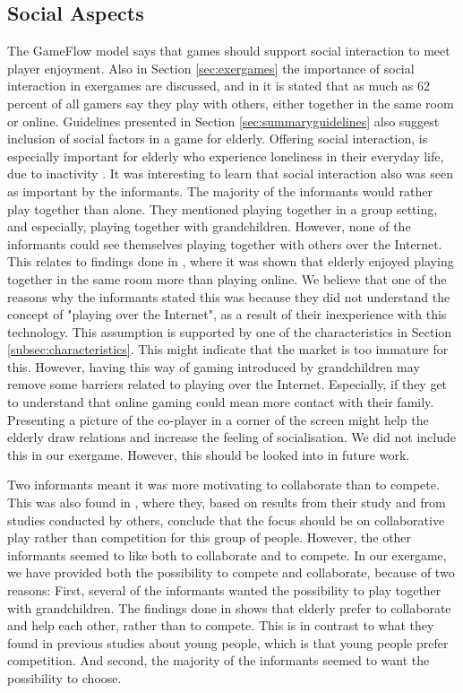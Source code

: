 \subsection{Social Aspects}
The GameFlow model says that games should support social interaction to meet player enjoyment. Also in Section \ref{sec:exergames} the importance of social interaction in exergames are discussed, and in \cite{statistics2012} it is stated that as much as 62 percent of all gamers say they play with others, either together in the same room or online. Guidelines presented in Section \ref{sec:summaryguidelines} also suggest inclusion of social factors in a game for elderly. Offering social interaction, is especially important for elderly who experience loneliness in their everyday life, due to inactivity \cite{exergamesforelderly}. It was interesting to learn that social interaction also was seen as important by the informants. The majority of the informants would rather play together than alone. They mentioned playing together in a group setting, and especially, playing together with grandchildren. However, none of the informants could see themselves playing together with others over the Internet. This relates to findings done in \cite{Gajadhar}, where it was shown that elderly enjoyed playing together in the same room more than playing online. We believe that one of the reasons why the informants stated this was because they did not understand the concept of "playing over the Internet", as a result of their inexperience with this technology. This assumption is supported by one of the characteristics in Section \ref{subsec:characteristics}. This might indicate that the market is too immature for this. However, having this way of gaming introduced by grandchildren may remove some barriers related to playing over the Internet. Especially, if they get to understand that online gaming could mean more contact with their family. Presenting a picture of the co-player in a corner of the screen might help the elderly draw relations and increase the feeling of socialisation. We did not include this in our exergame. However, this should be looked into in future work.


Two informants meant it was more motivating to collaborate than to compete. This was also found in \cite{Gajadhar}, where they, based on results from their study and from studies conducted by others, conclude that the focus should be on collaborative play rather than competition for this group of people. However, the other informants seemed to like both to collaborate and to compete. In our exergame, we have provided both the possibility to compete and collaborate, because of two reasons: First, several of the informants wanted the possibility to play together with grandchildren. The findings done in \cite{Gajadhar} shows that elderly prefer to collaborate and help each other, rather than to compete. This is in contrast to what they found in previous studies about young people, which is that young people prefer competition. And second, the majority of the informants seemed to want the possibility to choose. 

